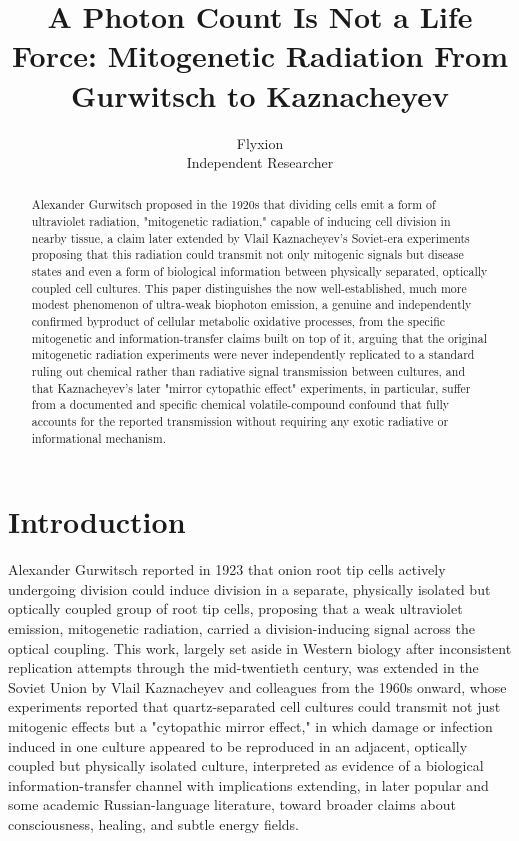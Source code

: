 \documentclass[11pt]{article}
\title{A Photon Count Is Not a Life Force: Mitogenetic Radiation From Gurwitsch to Kaznacheyev}
\author{Flyxion \\ \small Independent Researcher}
\date{}
\begin{document}
\maketitle

\begin{abstract}
Alexander Gurwitsch proposed in the 1920s that dividing cells emit a form of ultraviolet radiation, "mitogenetic radiation," capable of inducing cell division in nearby tissue, a claim later extended by Vlail Kaznacheyev's Soviet-era experiments proposing that this radiation could transmit not only mitogenic signals but disease states and even a form of biological information between physically separated, optically coupled cell cultures. This paper distinguishes the now well-established, much more modest phenomenon of ultra-weak biophoton emission, a genuine and independently confirmed byproduct of cellular metabolic oxidative processes, from the specific mitogenetic and information-transfer claims built on top of it, arguing that the original mitogenetic radiation experiments were never independently replicated to a standard ruling out chemical rather than radiative signal transmission between cultures, and that Kaznacheyev's later "mirror cytopathic effect" experiments, in particular, suffer from a documented and specific chemical volatile-compound confound that fully accounts for the reported transmission without requiring any exotic radiative or informational mechanism.
\end{abstract}

\section{Introduction}

Alexander Gurwitsch reported in 1923 that onion root tip cells actively undergoing division could induce division in a separate, physically isolated but optically coupled group of root tip cells, proposing that a weak ultraviolet emission, mitogenetic radiation, carried a division-inducing signal across the optical coupling. This work, largely set aside in Western biology after inconsistent replication attempts through the mid-twentieth century, was extended in the Soviet Union by Vlail Kaznacheyev and colleagues from the 1960s onward, whose experiments reported that quartz-separated cell cultures could transmit not just mitogenic effects but a "cytopathic mirror effect," in which damage or infection induced in one culture appeared to be reproduced in an adjacent, optically coupled but physically isolated culture, interpreted as evidence of a biological information-transfer channel with implications extending, in later popular and some academic Russian-language literature, toward broader claims about consciousness, healing, and subtle energy fields.
\end{document}
